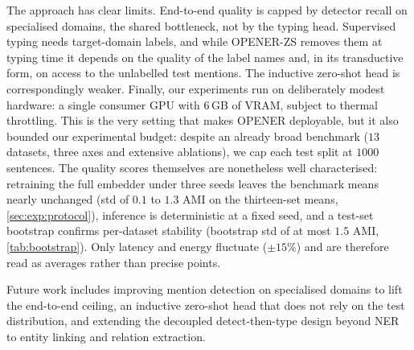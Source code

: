 The approach has clear limits.
End-to-end quality is capped by detector recall on specialised domains, the shared bottleneck, not by the typing head.
Supervised typing needs target-domain labels, and while OPENER-ZS removes them at typing time it depends on the quality of the label names and, in its transductive form, on access to the unlabelled test mentions. The inductive zero-shot head is correspondingly weaker.
Finally, our experiments run on deliberately modest hardware: a single consumer GPU with $6$\,GB of VRAM, subject to thermal throttling.
This is the very setting that makes OPENER deployable, but it also bounded our experimental budget: despite an already broad benchmark ($13$ datasets, three axes and extensive ablations), we cap each test split at $1000$ sentences.
The quality scores themselves are nonetheless well characterised: retraining the full embedder under three seeds leaves the benchmark means nearly unchanged (std of $0.1$ to $1.3$ AMI on the thirteen-set means, \autoref{sec:exp:protocol}), inference is deterministic at a fixed seed, and a test-set bootstrap confirms per-dataset stability (bootstrap std of at most $1.5$ AMI, \autoref{tab:bootstrap}). Only latency and energy fluctuate ($\pm 15\%$) and are therefore read as averages rather than precise points.

Future work includes improving mention detection on specialised domains to lift the end-to-end ceiling, an inductive zero-shot head that does not rely on the test distribution, and extending the decoupled detect-then-type design beyond NER to entity linking and relation extraction.
